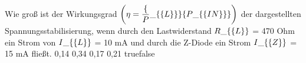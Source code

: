     {Wie groß ist der Wirkungsgrad $\left(\eta = \dfrac\{P\_\{\textrm\{L\}\}\}\{P\_\{\textrm\{IN\}\}\}\right)$ der dargestellten Spannungsstabilisierung, wenn durch den Lastwiderstand $R\_\{\textrm\{L\}\}$ = 470 Ohm ein Strom von $I\_\{\textrm\{L\}\}$ = 10 mA und durch die Z-Diode ein Strom $I\_\{\textrm\{Z\}\}$ = 15 mA fließt.}
    {0,14}
    {0,34}
    {0,17}
    {0,21}
    {true}{false}
